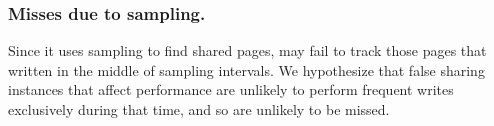 \subsubsection{Misses due to sampling.}  Since it uses sampling to find shared pages, \SheriffDetect{} may fail to track those pages that written in the middle of sampling intervals. We hypothesize that false sharing instances that affect performance are unlikely to perform frequent writes exclusively during that time, and so are unlikely to be missed.
